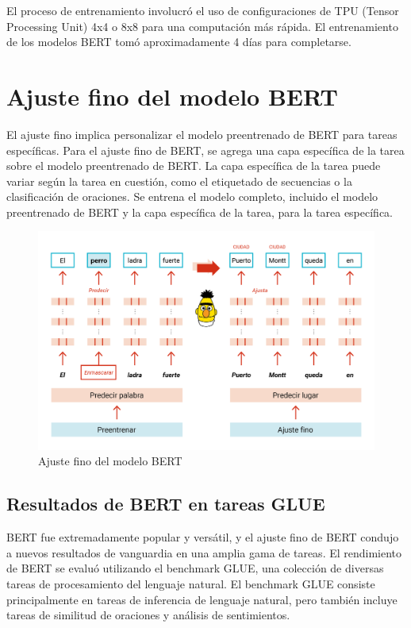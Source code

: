 El proceso de entrenamiento involucró el uso de configuraciones de TPU (Tensor Processing Unit) 4x4 o 8x8 para una computación más rápida. El entrenamiento de los modelos BERT tomó aproximadamente 4 días para completarse.

\section{Ajuste fino del modelo BERT}

El ajuste fino implica personalizar el modelo preentrenado de BERT para tareas específicas. Para el ajuste fino de BERT, se agrega una capa específica de la tarea sobre el modelo preentrenado de BERT. La capa específica de la tarea puede variar según la tarea en cuestión, como el etiquetado de secuencias o la clasificación de oraciones. Se entrena el modelo completo, incluido el modelo preentrenado de BERT y la capa específica de la tarea, para la tarea específica.

\begin{figure}[h]
  \centering
  \includegraphics[scale=0.5]{pics/BERTFineTuning.png}
  \caption{Ajuste fino del modelo BERT}
\end{figure}

\subsection{Resultados de BERT en tareas GLUE}

BERT fue extremadamente popular y versátil, y el ajuste fino de BERT condujo a nuevos resultados de vanguardia en una amplia gama de tareas. El rendimiento de BERT se evaluó utilizando el benchmark GLUE, una colección de diversas tareas de procesamiento del lenguaje natural. El benchmark GLUE consiste principalmente en tareas de inferencia de lenguaje natural, pero también incluye tareas de similitud de oraciones y análisis de sentimientos.

